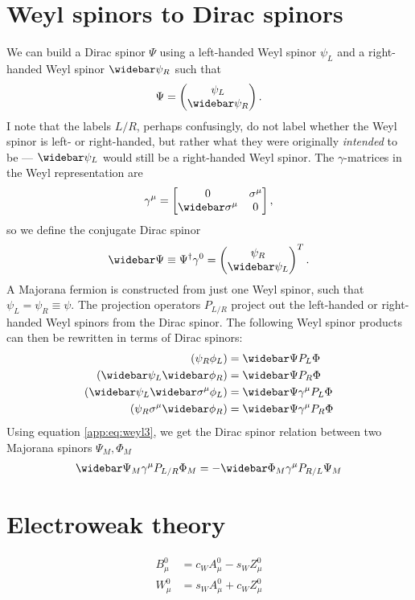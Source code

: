 \documentclass[english, notitlepage]{article}
\begin{document}
\section{Weyl spinors to Dirac spinors}
    We can build a Dirac spinor $\Psi$ using a left-handed Weyl spinor $\psi_L$ and a right-handed Weyl spinor $\wbar{\psi}_R$ such that
    \begin{align}
        \Psi = \begin{pmatrix} \psi_L \\ \wbar{\psi}_R \end{pmatrix}.
    \end{align}
    I note that the labels \(L/R\), perhaps confusingly, do not label whether the Weyl spinor is left- or right-handed, but rather what they were originally \textit{intended} to be --- \(\wbar{\psi}_L\) would still be a right-handed Weyl spinor.
    The $\gamma$-matrices in the Weyl representation are
    \begin{align}
        \gamma^\mu = \begin{bmatrix} 0 & \sigma^\mu \\ \wbar{\sigma}^\mu & 0 \end{bmatrix},
    \end{align}
    so we define the conjugate Dirac spinor
    \begin{align}
        \wbar{\Psi} \equiv \Psi^\dag \gamma^0 = \begin{pmatrix} \psi_R \\ \wbar{\psi}_L \end{pmatrix}^T.
    \end{align}
    A Majorana fermion is constructed from just one Weyl spinor, such that $\psi_L = \psi_R \equiv \psi$.
    The projection operators $P_{L/R}$ project out the left-handed or right-handed Weyl spinors from the Dirac spinor. The following Weyl spinor products can then be rewritten in terms of Dirac spinors:
    \begin{subequations}
        \begin{align}
            (\psi_{R} \phi_{L})                      & = \wbar{\Psi} P_L \Phi            \\
            (\wbar{\psi}_L \wbar{\phi}_R)            & = \wbar{\Psi} P_R \Phi            \\
            (\wbar{\psi}_L \wbar{\sigma}^\mu \phi_L) & = \wbar{\Psi} \gamma^\mu P_L \Phi \\
            (\psi_R \sigma^\mu \wbar{\phi}_R)        & = \wbar{\Psi} \gamma^\mu P_R \Phi
        \end{align}
    \end{subequations}
    Using equation \cref{app:eq:weyl3}, we get the Dirac spinor relation between two Majorana spinors \(\Psi_M, \Phi_M\)
    \begin{align}
        \wbar{\Psi}_M \gamma^\mu P_{L/R} \Phi_M = -\wbar{\Phi}_M \gamma^\mu P_{R/L} \Psi_M
    \end{align}

\section{Electroweak theory}
    \begin{subequations}
        \begin{align}
            B^0_\mu & = c_W A^0_\mu - s_W Z^0_\mu \\
            W^0_\mu & = s_W A^0_\mu + c_W Z^0_\mu
        \end{align}
    \end{subequations}
\end{document}
